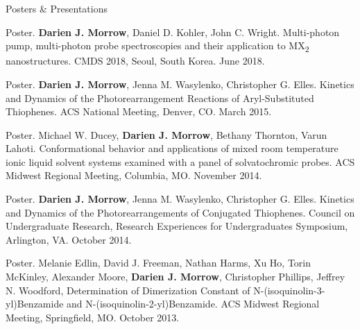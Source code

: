 \documentclass{resume} %
\begin{document}
\pagebreak
\begin{rSection}{Posters \& Presentations}
	
	
\begin{etaremune}
	\item Poster. \textbf{Darien J. Morrow}, Daniel D. Kohler, John C. Wright. Multi-photon pump, multi-photon probe spectroscopies and their application to MX\textsubscript{2} nanostructures. CMDS 2018, Seoul, South Korea. June 2018.

	\item Poster. \textbf{Darien J. Morrow}, Jenna M. Wasylenko, Christopher G. Elles. Kinetics and
	Dynamics of the Photorearrangement Reactions of Aryl-Substituted Thiophenes. ACS National Meeting, Denver, CO. March 2015. 
	
	\item Poster. Michael W. Ducey, \textbf{Darien J. Morrow}, Bethany Thornton, Varun Lahoti. Conformational behavior and applications of mixed room temperature ionic liquid solvent systems examined with a panel of solvatochromic probes. ACS Midwest Regional Meeting, Columbia, MO. November 2014.
	
	\item Poster. \textbf{Darien J. Morrow}, Jenna M. Wasylenko, Christopher G. Elles. Kinetics and Dynamics of the Photorearrangements of Conjugated Thiophenes. Council on Undergraduate Research, Research Experiences for Undergraduates Symposium, Arlington, VA. October 2014.
	
	
	
	\item Poster. Melanie Edlin, David J. Freeman, Nathan Harms, Xu Ho, Torin McKinley, Alexander Moore, \textbf{Darien J. Morrow}, Christopher Phillips, Jeffrey N. Woodford, Determination of Dimerization Constant of N-(isoquinolin-3-yl)Benzamide and N-(isoquinolin-2-yl)Benzamide. ACS Midwest Regional Meeting, Springfield, MO. October 2013.
	
	
\end{etaremune}
\end{rSection}
\end{document}

